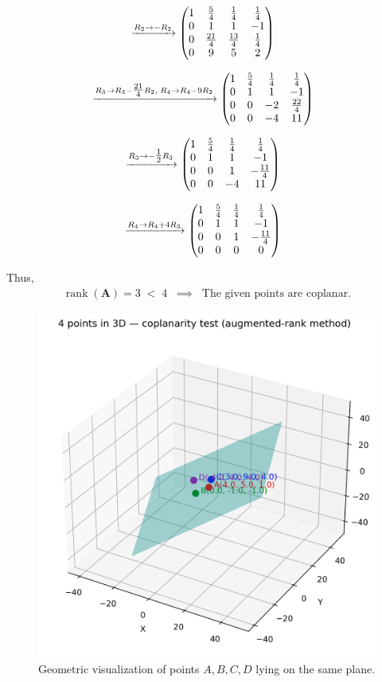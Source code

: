 \documentclass[12pt]{article}
\begin{document}
\begin{align}
&\xrightarrow{R_2 \to -R_2}
\begin{pmatrix}
1 & \tfrac{5}{4} & \tfrac{1}{4} & \tfrac{1}{4} \\
0 & 1 & 1 & -1 \\
0 & \tfrac{21}{4} & \tfrac{13}{4} & \tfrac{1}{4} \\
0 & 9 & 5 & 2
\end{pmatrix}
\end{align}

\begin{align}
&\xrightarrow{R_3 \to R_3 - \tfrac{21}{4}R_2,\; R_4 \to R_4 - 9R_2}
\begin{pmatrix}
1 & \tfrac{5}{4} & \tfrac{1}{4} & \tfrac{1}{4} \\
0 & 1 & 1 & -1 \\
0 & 0 & -2 & \tfrac{22}{4} \\
0 & 0 & -4 & 11
\end{pmatrix}
\end{align}

\begin{align}
&\xrightarrow{R_3 \to -\tfrac{1}{2}R_3}
\begin{pmatrix}
1 & \tfrac{5}{4} & \tfrac{1}{4} & \tfrac{1}{4} \\
0 & 1 & 1 & -1 \\
0 & 0 & 1 & -\tfrac{11}{4} \\
0 & 0 & -4 & 11
\end{pmatrix}
\end{align}

\begin{align}
&\xrightarrow{R_4 \to R_4 + 4R_3}
\begin{pmatrix}
1 & \tfrac{5}{4} & \tfrac{1}{4} & \tfrac{1}{4} \\
0 & 1 & 1 & -1 \\
0 & 0 & 1 & -\tfrac{11}{4} \\
0 & 0 & 0 & 0
\end{pmatrix}
\end{align}

Thus,
\begin{align}
\operatorname{rank}(\mathbf{A}) = 3 \;<\; 4 \;\;\implies\;\;
\text{The given points are coplanar.}
\end{align}

\newpage
\begin{figure}[H]
    \centering
    \includegraphics[width=0.55\linewidth]{figures/points_coplanarity.png}
    \caption{Geometric visualization of points $A, B, C, D$ lying on the same plane.}
    \label{fig:coplanarity}
\end{figure}
\end{document}
